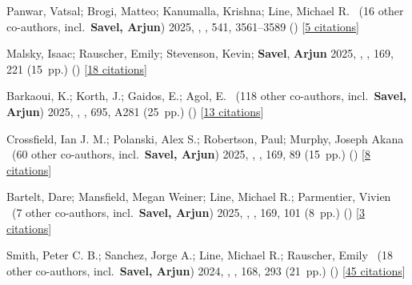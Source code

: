 \item[{\color{numcolor}\scriptsize40}] Panwar, Vatsal; Brogi, Matteo; Kanumalla, Krishna; Line, Michael R. \etal{}\ ({16} other co-authors, incl.\ \textbf{Savel, Arjun}) 2025, , \mnras, {541}, 3561--3589 () [\href{https://ui.adsabs.harvard.edu/abs/2025MNRAS.541.3561P}{5 citations}]

\item[{\color{numcolor}\scriptsize39}] Malsky, Isaac; Rauscher, Emily; Stevenson, Kevin; \textbf{Savel}, \textbf{Arjun} \etal{} 2025, , \aj, {169}, 221 (15~pp.) () [\href{https://ui.adsabs.harvard.edu/abs/2025AJ....169..221M}{18 citations}]

\item[{\color{numcolor}\scriptsize38}] Barkaoui, K.; Korth, J.; Gaidos, E.; Agol, E. \etal{}\ ({118} other co-authors, incl.\ \textbf{Savel, Arjun}) 2025, , \aanda, {695}, A281 (25~pp.) () [\href{https://ui.adsabs.harvard.edu/abs/2025A&A...695A.281B}{13 citations}]

\item[{\color{numcolor}\scriptsize37}] Crossfield, Ian J. M.; Polanski, Alex S.; Robertson, Paul; Murphy, Joseph Akana \etal{}\ ({60} other co-authors, incl.\ \textbf{Savel, Arjun}) 2025, , \aj, {169}, 89 (15~pp.) () [\href{https://ui.adsabs.harvard.edu/abs/2025AJ....169...89C}{8 citations}]

\item[{\color{numcolor}\scriptsize36}] Bartelt, Dare; Mansfield, Megan Weiner; Line, Michael R.; Parmentier, Vivien \etal{}\ ({7} other co-authors, incl.\ \textbf{Savel, Arjun}) 2025, , \aj, {169}, 101 (8~pp.) () [\href{https://ui.adsabs.harvard.edu/abs/2025AJ....169..101B}{3 citations}]

\item[{\color{numcolor}\scriptsize35}] Smith, Peter C. B.; Sanchez, Jorge A.; Line, Michael R.; Rauscher, Emily \etal{}\ ({18} other co-authors, incl.\ \textbf{Savel, Arjun}) 2024, , \aj, {168}, 293 (21~pp.) () [\href{https://ui.adsabs.harvard.edu/abs/2024AJ....168..293S}{45 citations}]

